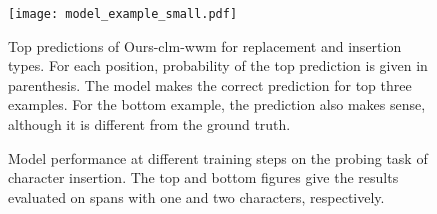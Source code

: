 \documentclass[11pt]{article}
\begin{document}

\begin{figure*}[ht]
     \centering
     \texttt{[image: model\_example\_small.pdf]}
     \caption{Top predictions of Ours-clm-wwm for replacement and insertion types. For each position, probability of the top prediction is given in parenthesis. The model makes the correct prediction for top three examples. For the bottom example, the prediction also makes sense, although it is different from the ground truth.}
     \label{fig:model_example}
\end{figure*}
\begin{figure}[t]
  \centering
  \caption{Model performance at different training steps on the probing task of character insertion. The top and bottom figures give the results evaluated on spans with one and two characters, respectively.}
  \label{fig:trainingprocess}
\end{figure}
\end{document}
